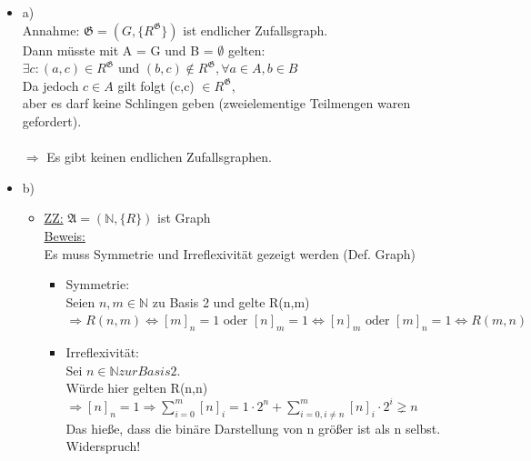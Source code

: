 \documentclass[a4paper]{scrartcl}
\begin{document}
    \begin{itemize}
        \item a)\\
            Annahme: $\mathfrak{G} = (G, \{R^{\mathfrak{G}}\})$ ist endlicher Zufallsgraph.\\
            Dann müsste mit A = G und B = $\emptyset$ gelten:\\
            $\exists c: (a,c) \in R^{\mathfrak{G}} \text{ und } (b,c) \notin R^{\mathfrak{G}}, \forall a \in A, b \in B$\\
            Da jedoch $c \in A$ gilt folgt (c,c) $\in R^{\mathfrak{G}}$,\\
            aber es darf keine Schlingen geben (zweielementige Teilmengen waren gefordert).\\
            \\$\Rightarrow$ Es gibt keinen endlichen Zufallsgraphen.

        \item b)\\
            \begin{itemize}
                \item \underline{ZZ:} $\mathfrak{A} = (\mathds{N}, \{R\})$ ist Graph\\
                    \underline{Beweis:}\\
                    Es muss Symmetrie und Irreflexivität gezeigt werden (Def. Graph)
                    \begin{itemize}
                        \item Symmetrie:\\
                            Seien $n,m \in \mathds{N}$ zu Basis 2 und gelte R(n,m)\\
                            $\Rightarrow R(n,m) \Leftrightarrow [m]_n = 1 \text{ oder } [n]_m = 1 \Leftrightarrow [n]_m \text{ oder } [m]_n = 1 \Leftrightarrow
                            R(m,n)$\\
                        \item Irreflexivität:\\
                            Sei $n \in \mathds{N} zur Basis 2$.\\
                            Würde hier gelten R(n,n) $\Rightarrow [n]_n = 1 \Rightarrow \sum^{m}_{i=0}[n]_i = 1 \cdot 2^n + \sum^{m}_{i=0, i \neq n} [n]_i \cdot 2^i 
                            \gneq n$\\
                            Das hieße, dass die binäre Darstellung von n größer ist als n selbst. Widerspruch!
                    \end{itemize}


\end{itemize}
\end{itemize}
\end{document}
